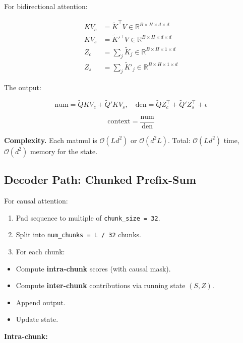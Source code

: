 For bidirectional attention:

\begin{equation}
\begin{aligned}
KV_c &= \tilde{K}^\top V \in \mathbb{R}^{B \times H \times d \times d} \\
KV_s &= \tilde{K}'^\top V \in \mathbb{R}^{B \times H \times d \times d} \\
Z_c &= \sum_j \tilde{K}_j \in \mathbb{R}^{B \times H \times 1 \times d} \\
Z_s &= \sum_j \tilde{K}'_j \in \mathbb{R}^{B \times H \times 1 \times d}
\end{aligned}
\end{equation}

The output:

\begin{equation}
\text{num} = \tilde{Q} KV_c + \tilde{Q}' KV_s, \quad
\text{den} = \tilde{Q} Z_c^\top + \tilde{Q}' Z_s^\top + \epsilon
\end{equation}

\begin{equation}
\text{context} = \frac{\text{num}}{\text{den}}
\end{equation}

\textbf{Complexity.} Each matmul is $\mathcal{O}(L d^2)$ or $\mathcal{O}(d^2 L)$. 
Total: $\mathcal{O}(L d^2)$ time, $\mathcal{O}(d^2)$ memory for the state.

\subsection{Decoder Path: Chunked Prefix-Sum}

For causal attention:

\begin{enumerate}
\item Pad sequence to multiple of \texttt{chunk\_size = 32}.
\item Split into \texttt{num\_chunks = L / 32} chunks.
\item For each chunk:
\end{enumerate}
\begin{itemize}
\item Compute \textbf{intra-chunk} scores (with causal mask).
\item Compute \textbf{inter-chunk} contributions via running state $(S, Z)$.
\item Append output.
\item Update state.

\end{itemize}
\textbf{Intra-chunk:}

